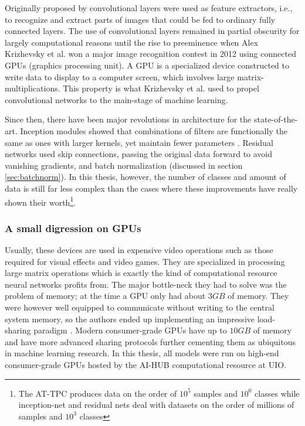 Originally proposed by \citet{Lecun1998} convolutional layers were used as feature extractors, i.e., to recognize and extract parts of images that could be fed to ordinary fully connected layers. The use of convolutional layers remained in partial obscurity for largely computational reasons until the rise to preeminence when Alex Krizhevsky et al. won a major image recognition contest in 2012 using connected GPUs (graphics processing unit)\cite{Krizhevsky2012}. A GPU is a specialized device constructed to write data to display to a computer screen, which involves large matrix-multiplications. This property is what Krizhevsky et al. used to propel convolutional networks to the main-stage of machine learning.

Since then, there have been major revolutions in architecture for the state-of-the-art. Inception modules showed that combinations of filters are functionally the same as ones with larger kernels, yet maintain fewer parameters \cite{Szegedy2014}. Residual networks used skip connections, passing the original data forward to avoid vanishing gradients, and batch normalization (discussed in section \ref{sec:batchnorm}). In this thesis, however, the number of classes and amount of data is still far less complex than the cases where these improvements have really shown their worth\footnote{The AT-TPC produces data on the order of $10^5$ samples and $10^0$ classes while inception-net and residual nets deal with datasets on the order of millions of samples and $10^3$ classes}.

\subsubsection{A small digression on GPUs}
Usually, these devices are used in expensive video operations such as those required for visual effects and video games. They are specialized in processing large matrix operations which is exactly the kind of computational resource neural networks profits from. The major bottle-neck they had to solve was the problem of memory; at the time a GPU only had about $3 GB$ of memory. They were however well equipped to communicate without writing to the central system memory, so the authors ended up implementing an impressive load-sharing paradigm \cite{Krizhevsky2012}. Modern consumer-grade GPUs have up to $10 GB$ of memory and have more advanced sharing protocols further cementing them as ubiquitous in machine learning research. In this thesis, all models were run on high-end consumer-grade GPUs hosted by the AI-HUB computational resource at UIO.
